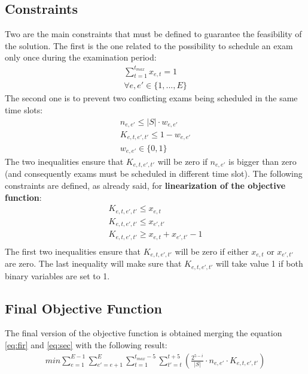 \documentclass[12pt]{article}
\begin{document}
\subsection{Constraints}
Two  are the main constraints that must be defined to guarantee the feasibility of the solution.
The first is the one related to the possibility to schedule an exam only once during the examination period:
\begin{equation}
  \begin{gathered}
     \sum_{t=1}^{t_{max}} x_{e,t} = 1\\
     \forall e, e' \in \{1,...,E\}
  \end{gathered}
\end{equation}
The second one is to prevent two conflicting exams being scheduled in the same time slots:
\begin{equation}
  \begin{gathered}
     n_{e,e'} \leq |S| \cdot w_{e,e'}\\
     K_{e,t,e',t'} \leq 1 - w_{e,e'}\\
     w_{e,e'} \in \{0,1\}
  \end{gathered}
\end{equation}
The two inequalities ensure that \textit{$K_{e,t,e',t'}$} will be zero if \textit{$n_{e,e'}$} is bigger than zero (and consequently exams must be scheduled in different time slot).
The following constraints are defined, as already said, for \textbf{linearization of the objective function}:
\begin{equation}
  \begin{gathered}
     K_{e,t,e',t'} \leq x_{e,t}\\
     K_{e,t,e',t'} \leq x_{e',t'}\\
     K_{e,t,e',t'} \geq x_{e,t} + x_{e',t'} - 1\\
     \label{eq:linearize}
  \end{gathered}
\end{equation}
The first two inequalities ensure that \textit{$K_{e,t,e',t'}$} will be zero if either \textit{$x_{e,t}$} or \textit{$x_{e',t'}$} are zero. The last inequality will make sure that \textit{$K_{e,t,e',t'}$} will take value 1 if both binary variables are set to 1.

\subsection{Final Objective Function}
The final version of the objective function is obtained merging the equation \ref{eq:fir} and \ref{eq:sec} with the following result:
\begin{equation}
  \begin{gathered}
    min\sum_{e=1}^{E-1}\sum_{e'=e+1}^{E}\sum_{t=1}^{t_{max}-5}\sum_{t'=t}^{t+5} (\frac{2^{5-i}}{|S|} \cdot n_{e,e'} \cdot K_{e,t,e',t'})
    \label{eq:final}
  \end{gathered}
\end{equation}
\end{document}
